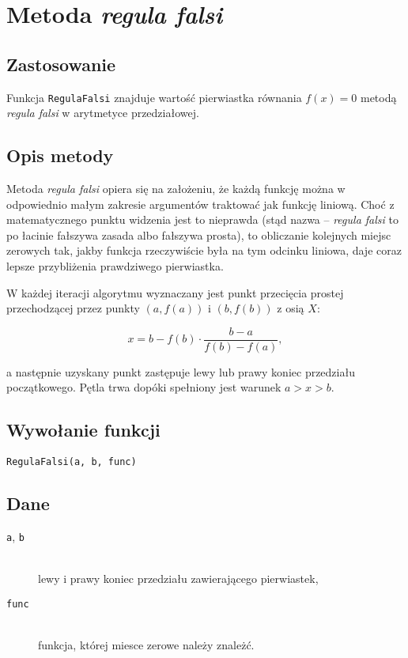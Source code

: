 \documentclass[12pt]{article}
\begin{document}
	\section{Metoda \textsl{regula falsi}}
		\subsection{Zastosowanie}
  		Funkcja \texttt{RegulaFalsi} znajduje wartość pierwiastka równania
  		$f(x) = 0$ metodą \textsl{regula falsi} w arytmetyce przedziałowej.

		\subsection{Opis metody}
  		Metoda \textsl{regula falsi} opiera się na założeniu, że każdą funkcję
  		można w odpowiednio małym zakresie argumentów traktować jak funkcję liniową.
      Choć z matematycznego punktu widzenia jest to nieprawda (stąd nazwa --
      \textsl{regula falsi} to po łacinie fałszywa zasada albo fałszywa prosta),
      to obliczanie kolejnych miejsc zerowych tak, jakby funkcja
      rzeczywiście była na tym odcinku liniowa, daje coraz lepsze przybliżenia
      prawdziwego pierwiastka.

      W każdej iteracji algorytmu wyznaczany jest punkt przecięcia prostej
      przechodzącej przez punkty $(a, f(a))$ i $(b, f(b))$ z osią $X$:

      \begin{equation*}
        x = b - f(b) \cdot \frac{b - a}{f(b) - f(a)},
      \end{equation*}

      a następnie uzyskany punkt zastępuje lewy lub prawy koniec przedziału początkowego.
      Pętla trwa dopóki spełniony jest warunek $a > x > b$.

    \subsection{Wywołanie funkcji}
  		\texttt{RegulaFalsi(a, b, func)}

  	\subsection{Dane}
  		\begin{description}
				\item[\texttt{a}, \texttt{b}] \hfill\\ lewy i prawy koniec przedziału zawierającego pierwiastek,
				\item[\texttt{func}] \hfill\\ funkcja, której miesce zerowe należy znależć.
			\end{description}
\end{document}
